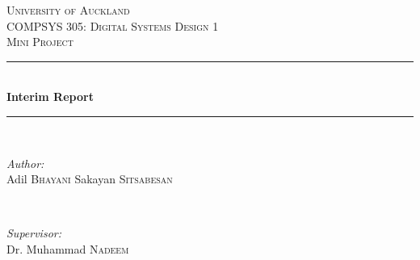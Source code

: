 \documentclass[a4paper,10pt,twoside]{article}
\begin{document}
\begin{titlepage}

\newcommand{\HRule}{\rule{\linewidth}{0.5mm}} %

\center %
 

\textsc{\LARGE University of Auckland}\\[1.5cm] %
\textsc{\Large COMPSYS 305: Digital Systems Design 1}\\[0.5cm] %
\textsc{\large Mini Project }\\[0.5cm] %


\HRule \\[0.4cm]
{ \huge \bfseries Interim Report}\\[0.4cm] %
\HRule \\[1.5cm]
 

\begin{minipage}{0.4\textwidth}
\begin{flushleft} \large
\emph{Author:}\\
Adil \textsc{Bhayani} \newline
Sakayan \textsc{Sitsabesan}
\end{flushleft}
\end{minipage}
~
\begin{minipage}{0.4\textwidth}
\begin{flushright} \large
\emph{Supervisor:} \\
Dr. Muhammad \textsc{Nadeem} %
\end{flushright}
\end{minipage}\\[1cm]




\end{titlepage}
\end{document}
